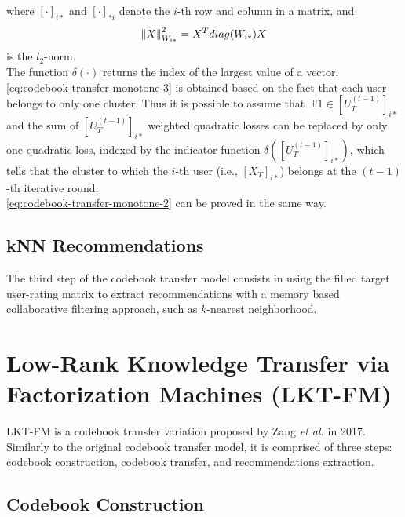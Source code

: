 where $[\cdot]_{i*}$ and $[\cdot]_{*i}$ denote the $i$-th row and column in a matrix, and
\begin{equation*}
\left\lVert X\right\rVert_{W_{i*}}^2 = X^T diag(W_{i*}) X
\end{equation*}
is the $l_2$-norm.\\
The function $\delta(\cdot)$ returns the index of the largest value of a vector.\\
\autoref{eq:codebook-transfer-monotone-3} is obtained based on the fact that each user belongs to only one cluster. Thus it is possible to assume that $\exists! 1 \in [U_T^{(t - 1)}]_{i*}$ and the sum of $[U_T^{(t - 1)}]_{i*}$ weighted quadratic losses can be replaced by only one quadratic loss, indexed by the indicator function $\delta([U_T^{(t - 1)}]_{i*})$, which tells that the cluster to which the $i$-th user (i.e., $[X_T]_{i*}$) belongs at the $(t-1)$-th iterative round.\\
\autoref{eq:codebook-transfer-monotone-2} can be proved in the same way.


\subsection{kNN Recommendations}

The third step of the codebook transfer model consists in using the filled target user-rating matrix to extract recommendations with a memory based collaborative filtering approach, such as $k$-nearest neighborhood.


\section{Low-Rank Knowledge Transfer via Factorization Machines (LKT-FM)}

LKT-FM is a codebook transfer variation proposed by Zang \textit{et al.} \cite{10.1007/978-3-319-71246-8_39} in 2017.\\
Similarly to the original codebook transfer model, it is comprised of three steps: codebook construction, codebook transfer, and recommendations extraction.


\subsection{Codebook Construction}

